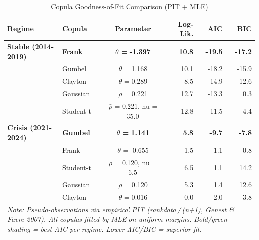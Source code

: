 \begin{table}[htbp]
\centering
\caption{Copula Goodness-of-Fit Comparison (PIT + MLE)}
\label{tab:copula_gof}
\begin{tabular}{llcrrr}
\toprule
Regime & Copula & Parameter & Log-Lik. & AIC & BIC \\
\midrule
\textbf{Stable (2014-2019)} & \textbf{Frank} & \textbf{$\theta$ = -1.397} & \textbf{10.8} & \textbf{-19.5} & \textbf{-17.2} \\
 & Gumbel & $\theta$ = 1.168 & 10.1 & -18.2 & -15.9 \\
 & Clayton & $\theta$ = 0.289 & 8.5 & -14.9 & -12.6 \\
 & Gaussian & $\bar{\rho}$ = 0.221 & 12.7 & -13.3 & 0.3 \\
 & Student-t & $\bar{\rho}$ = 0.221, nu = 35.0 & 12.8 & -11.5 & 4.4 \\
\midrule
\textbf{Crisis (2021-2024)} & \textbf{Gumbel} & \textbf{$\theta$ = 1.141} & \textbf{5.8} & \textbf{-9.7} & \textbf{-7.8} \\
 & Frank & $\theta$ = -0.655 & 1.5 & -1.1 & 0.8 \\
 & Student-t & $\bar{\rho}$ = 0.120, nu = 6.5 & 6.5 & 1.1 & 14.2 \\
 & Gaussian & $\bar{\rho}$ = 0.120 & 5.3 & 1.4 & 12.6 \\
 & Clayton & $\theta$ = 0.016 & 0.0 & 2.0 & 3.8 \\
\bottomrule
\multicolumn{6}{l}{\footnotesize \textit{Note: Pseudo-observations via empirical PIT (rankdata\,/\,(n+1), Genest \& Favre 2007). All copulas fitted by MLE on uniform margins. Bold/green shading = best AIC per regime. Lower AIC/BIC = superior fit.}} \\
\end{tabular}
\end{table}